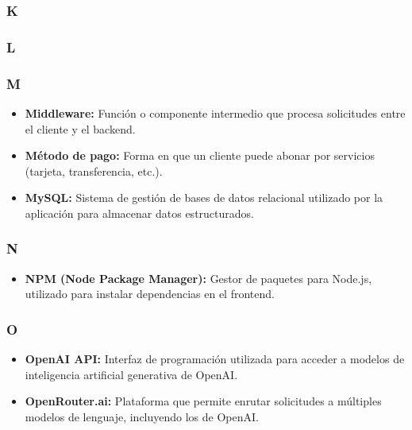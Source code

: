\subsubsection*{K}

\subsubsection*{L}

\subsubsection*{M}
\begin{itemize}
    \item \textbf {Middleware:} Función o componente intermedio que procesa solicitudes entre el cliente y el backend.
    \item \textbf {Método de pago:} Forma en que un cliente puede abonar por servicios (tarjeta, transferencia, etc.).
    \item \textbf {MySQL:} Sistema de gestión de bases de datos relacional utilizado por la aplicación para almacenar datos estructurados.
\end{itemize}

\subsubsection*{N}
\begin{itemize}
    \item \textbf {NPM (Node Package Manager):} Gestor de paquetes para Node.js, utilizado para instalar dependencias en el frontend.
\end{itemize}

\subsubsection*{O}
\begin{itemize}
    \item \textbf{OpenAI API:} Interfaz de programación utilizada para acceder a modelos de inteligencia artificial generativa de OpenAI.
    \item \textbf{OpenRouter.ai:} Plataforma que permite enrutar solicitudes a múltiples modelos de lenguaje, incluyendo los de OpenAI.
\end{itemize}

